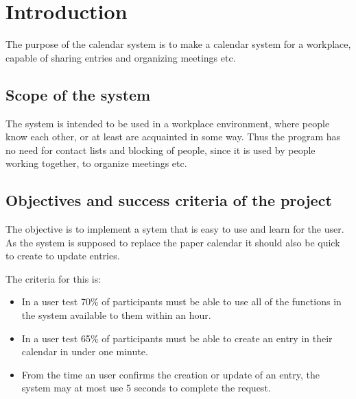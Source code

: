 \section{Introduction}
The purpose of the calendar system is to make a calendar system for a workplace, capable of sharing entries and organizing meetings etc.
\subsection{Scope of the system}
The system is intended to be used in a workplace environment, where people know each other, or at least are acquainted in some way. Thus the program has no need for contact lists and blocking of people, since it is used by people working together, to organize meetings etc.
\subsection{Objectives and success criteria of the project}
The objective is to implement a sytem that is easy to use and learn for the user. As the system is supposed to replace the paper calendar it should also be quick to create to update entries.

The criteria for this is:
\begin{itemize}
\item In a user test 70\% of participants must be able to use all of the functions in the system available to them within an hour.
\item In a user test 65\% of participants must be able to create an entry in their calendar in under one minute.
\item From the time an user confirms the creation or update of an entry, the system may at most use 5 seconds to complete the request.
\end{itemize}